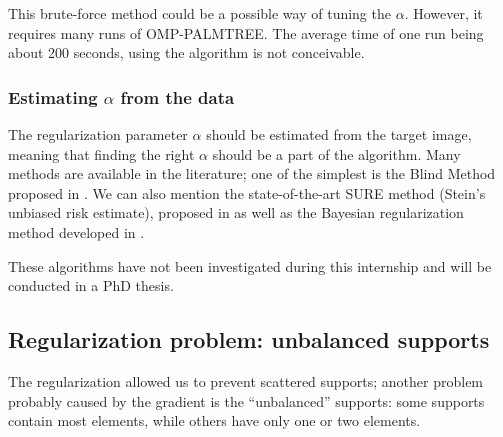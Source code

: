 
\noindent
This brute-force method could be a possible way of tuning the $\alpha$. However, it requires many runs of OMP-PALMTREE. The average time of one run being about 200 seconds, using the algorithm is not conceivable.

\subsubsection{Estimating $\alpha$ from the data}

The regularization parameter $\alpha$ should be estimated from the target image, meaning that finding the right $\alpha$ should be a part of the algorithm. Many methods are available in the literature; one of the simplest is the Blind Method proposed in \cite{almeida_parameter_2013}. We can also mention the state-of-the-art SURE method (Stein’s unbiased risk estimate), proposed in \cite{eldar_generalized_2009} as well as the Bayesian regularization method developed in \cite{archer_bayesian/regularization_1995}.

\noindent
These algorithms have not been investigated during this internship and will be conducted in a PhD thesis.

\subsection{Regularization problem: unbalanced supports}\label{sec_pbm_unbalanced_supports}
The regularization allowed us to prevent scattered supports; another problem probably caused by the gradient is the “unbalanced” supports: some supports contain most elements, while others have only one or two elements. 

